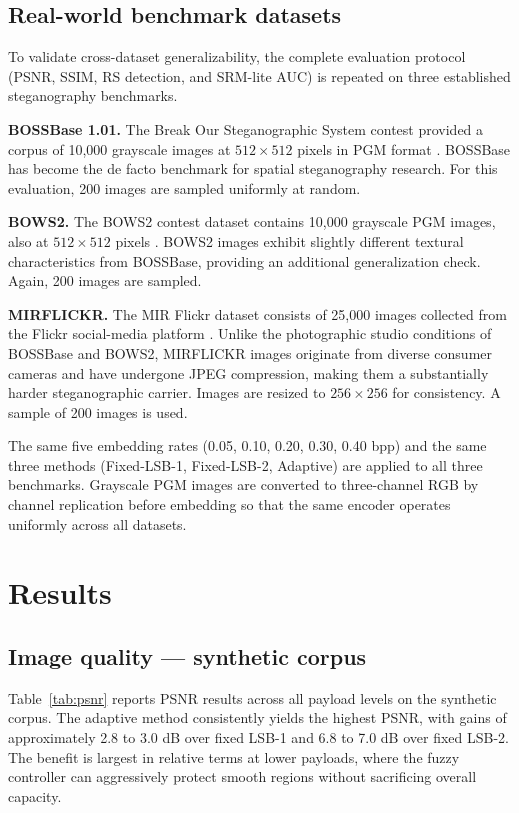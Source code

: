 \subsection{Real-world benchmark datasets}
\label{sec:real_datasets}

To validate cross-dataset generalizability, the complete evaluation protocol (PSNR, SSIM, RS detection, and SRM-lite AUC) is repeated on three established steganography benchmarks.

\textbf{BOSSBase 1.01.} The Break Our Steganographic System contest provided a corpus of 10,000 grayscale images at $512 \times 512$ pixels in PGM format \cite{bas2011boss}. BOSSBase has become the de facto benchmark for spatial steganography research. For this evaluation, 200 images are sampled uniformly at random.

\textbf{BOWS2.} The BOWS2 contest dataset contains 10,000 grayscale PGM images, also at $512 \times 512$ pixels \cite{bows2007}. BOWS2 images exhibit slightly different textural characteristics from BOSSBase, providing an additional generalization check. Again, 200 images are sampled.

\textbf{MIRFLICKR.} The MIR Flickr dataset consists of 25,000 images collected from the Flickr social-media platform \cite{huiskes2008}. Unlike the photographic studio conditions of BOSSBase and BOWS2, MIRFLICKR images originate from diverse consumer cameras and have undergone JPEG compression, making them a substantially harder steganographic carrier. Images are resized to $256 \times 256$ for consistency. A sample of 200 images is used.

The same five embedding rates (0.05, 0.10, 0.20, 0.30, 0.40 bpp) and the same three methods (Fixed-LSB-1, Fixed-LSB-2, Adaptive) are applied to all three benchmarks. Grayscale PGM images are converted to three-channel RGB by channel replication before embedding so that the same encoder operates uniformly across all datasets.

\section{Results}
\subsection{Image quality --- synthetic corpus}
Table~\ref{tab:psnr} reports PSNR results across all payload levels on the synthetic corpus. The adaptive method consistently yields the highest PSNR, with gains of approximately 2.8 to 3.0 dB over fixed LSB-1 and 6.8 to 7.0 dB over fixed LSB-2. The benefit is largest in relative terms at lower payloads, where the fuzzy controller can aggressively protect smooth regions without sacrificing overall capacity.

